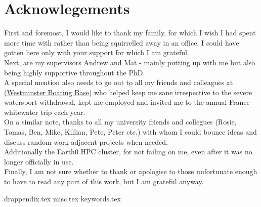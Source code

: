 \documentclass[twoside,openleft,reqno,a4paper,final]{book}
\newcommand{\chapterbib}{
\newpage


}
\begin{document}

    \chapter*{Acknowlegements}


\parbox{.75\textwidth}{
 First and foremost, I would like to thank my family, for which I wish I had spent more time with rather than being squirrelled away in an office. I could have gotten here only with your support for which I am grateful.\\

 Next, are my supervisors Andrew and Mat - mainly putting up with me but also being highly supportive throughout the PhD.\\

 A special mention also needs to go out to all my friends and colleagues at (\href{www.westminsterboatingbase.co.uk} {Westminster Boating Base}) who helped keep me sane irrespective to the severe watersport withdrawal, kept me employed and invited me to the annual France whitewater trip each year.\\

 On a similar note, thanks to all my university friends and collegues  (Rosie, Tomas, Ben, Mike, Killian, Pete, Peter etc.) with whom I could bounce ideas and discuss random work adjacent projects when needed.\\

 Additionally the Earth0 HPC cluster, for not failing on me, even after it was no longer officially in use.\\

 Finally, I am not sure whether to thank or apologise to those unfortunate enough to have to read any part of this work, but I am grateful anyway.\\

}



\tableofcontents
\newpage

\listoffigures
\listoftables
\newpage
\mainmatter



% 
%
%  
% 
% 
%
%  
%
%  
 


\cleardoublepage\makeatletter\@openrightfalse\makeatother
\begin{appendices}
{drappendix.tex}
{misc.tex}
{keywords.tex}

\end{appendices}




\newpage
%
%
%
\end{document}
